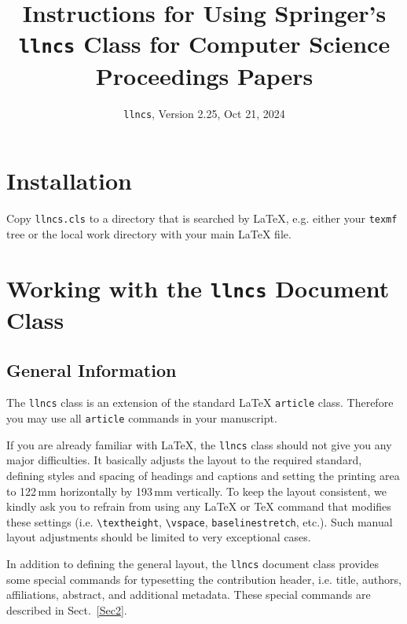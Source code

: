 \documentclass{llncs}
\begin{document}
    \title{Instructions for Using Springer's \texttt{llncs} Class for
    Computer Science Proceedings Papers}
%
    \subtitle{\texttt{llncs}, Version 2.25, Oct 21, 2024}
%
    \author{}
    \institute{}

    \maketitle \thispagestyle{empty}
%


    \section{Installation}
%
    Copy \texttt{llncs.cls} to a directory that is searched by \LaTeX{},
    e.g. either your \texttt{texmf} tree or the local work directory with your main
        {\LaTeX} file.

%


    \section{Working with the \texttt{llncs} Document Class}
%

    \subsection{General Information}
    The \texttt{llncs} class is an extension of the standard \LaTeX{} \texttt{article}
    class. Therefore you may use all \texttt{article} commands in your
    manuscript.

    If you are already familiar with \LaTeX{}, the \texttt{llncs} class should
    not give you any major difficulties. It basically adjusts the layout
    to the required standard, defining styles and spacing of headings
    and captions and setting the printing area to 122\,mm horizontally
    by 193\,mm vertically. To keep the layout consistent, we kindly ask
    you to refrain from using any \LaTeX{} or \TeX{} command that
    modifies these settings (i.e. \verb|\textheight|, \verb|\vspace|,
    \verb|baselinestretch|, etc.). Such manual layout adjustments should
    be limited to very exceptional cases.

    In addition to defining the general layout, the \texttt{llncs} document class
    provides some special commands for typesetting the contribution
    header, i.e. title, authors, affiliations, abstract, and additional
    metadata. These special commands are described in Sect.~\ref{Sec2}.
\end{document}
